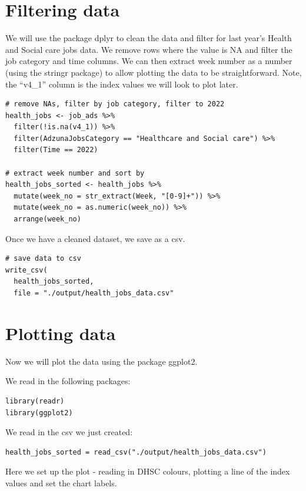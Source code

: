 \documentclass[
]{book}
\begin{document}
\hypertarget{filtering-data}{%
\section{Filtering data}\label{filtering-data}}

We will use the package dplyr to clean the data and filter for last year's Health and Social care jobs data. We remove rows where the value is NA and filter the job category and time columns. We can then extract week number as a number (using the stringr package) to allow plotting the data to be straightforward. Note, the ``v4\_1'' column is the index values we will look to plot later.

\begin{verbatim}
# remove NAs, filter by job category, filter to 2022
health_jobs <- job_ads %>%
  filter(!is.na(v4_1)) %>%
  filter(AdzunaJobsCategory == "Healthcare and Social care") %>%
  filter(Time == 2022)

# extract week number and sort by
health_jobs_sorted <- health_jobs %>%
  mutate(week_no = str_extract(Week, "[0-9]+")) %>%
  mutate(week_no = as.numeric(week_no)) %>%
  arrange(week_no)
\end{verbatim}

Once we have a cleaned dataset, we save as a csv.

\begin{verbatim}
# save data to csv
write_csv(
  health_jobs_sorted,
  file = "./output/health_jobs_data.csv"
\end{verbatim}

\hypertarget{plotting-data}{%
\section{Plotting data}\label{plotting-data}}

Now we will plot the data using the package ggplot2.

We read in the following packages:

\begin{verbatim}
library(readr)
library(ggplot2)
\end{verbatim}

We read in the csv we just created:

\begin{verbatim}
health_jobs_sorted = read_csv("./output/health_jobs_data.csv")
\end{verbatim}

Here we set up the plot - reading in DHSC colours, plotting a line of the index values and set the chart labels.
\end{document}
